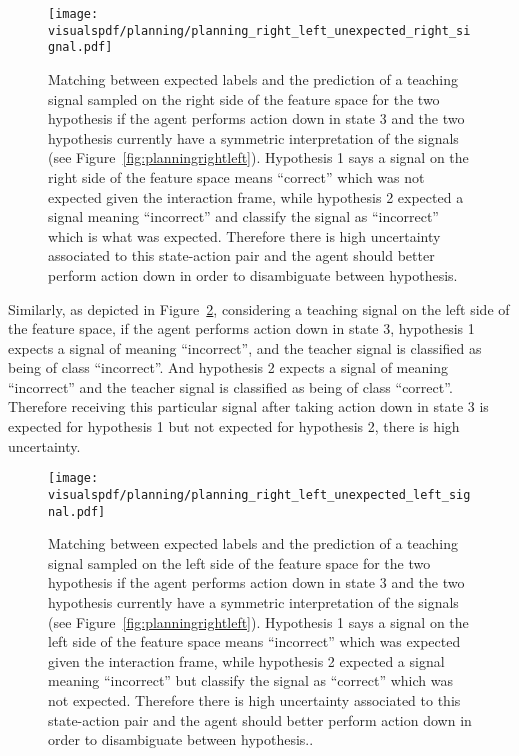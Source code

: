 \begin{figure}[!htbp]
  \centering
  \texttt{[image: \\visualspdf/planning/planning\_right\_left\_unexpected\_right\_signal.pdf]}
  \caption{Matching between expected labels and the prediction of a teaching signal sampled on the right side of the feature space for the two hypothesis if the agent performs action down in state 3 and the two hypothesis currently have a symmetric interpretation of the signals (see Figure~\ref{fig:planningrightleft}). Hypothesis 1 says a signal on the right side of the feature space means ``correct'' which was not expected given the interaction frame, while hypothesis 2 expected a signal meaning ``incorrect'' and classify the signal as ``incorrect'' which is what was expected. Therefore there is high uncertainty associated to this state-action pair and the agent should better perform action down in order to disambiguate between hypothesis.}
  \label{fig:uncertaintymeaningrightleftunexpectedright}
\end{figure}

Similarly, as depicted in Figure~\ref{fig:uncertaintymeaningrightleftunexpectedleft}, considering a teaching signal on the left side of the feature space, if the agent performs action down in state 3, hypothesis 1 expects a signal of meaning ``incorrect'', and the teacher signal is classified as being of class ``incorrect''. And hypothesis 2 expects a signal of meaning ``incorrect'' and the teacher signal is classified as being of class ``correct''. Therefore receiving this particular signal after taking action down in state 3 is expected for hypothesis 1 but not expected for hypothesis 2, there is high uncertainty.

\begin{figure}[!htbp]
  \centering
  \texttt{[image: \\visualspdf/planning/planning\_right\_left\_unexpected\_left\_signal.pdf]}
  \caption{Matching between expected labels and the prediction of a teaching signal sampled on the left side of the feature space for the two hypothesis if the agent performs action down in state 3 and the two hypothesis currently have a symmetric interpretation of the signals (see Figure~\ref{fig:planningrightleft}). Hypothesis 1 says a signal on the left side of the feature space means ``incorrect'' which was expected given the interaction frame, while hypothesis 2 expected a signal meaning ``incorrect'' but classify the signal as ``correct'' which was not expected. Therefore there is high uncertainty associated to this state-action pair and the agent should better perform action down in order to disambiguate between hypothesis..}
  \label{fig:uncertaintymeaningrightleftunexpectedleft}
\end{figure}

